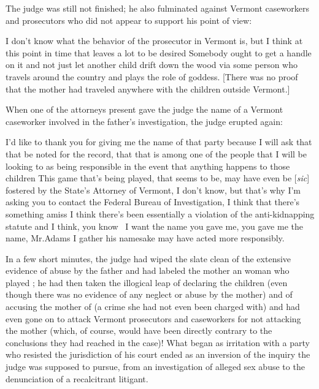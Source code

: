 \documentclass[11pt, twoside]{article}
\begin{document}
{{\nip{}%
The judge was still not finished; he also fulminated against Vermont
caseworkers and prosecutors who did not appear to support his point
of view:

\begin{blockQuote}
I don’t know what the behavior of the prosecutor in Vermont is, but
I think at this point in time that leaves a lot to be desired\ellFour{2pt}{2pt} Somebody ought to get a handle on it and not just let another child drift
down the wood via some person who travels around the country
and plays the role of goddess. [There was no proof that the mother
had traveled anywhere with the children outside Vermont.]
\end{blockQuote}

\nip{}%
When one of the attorneys present gave the judge the name of a Vermont
caseworker involved in the father’s investigation, the judge erupted
again:

\begin{blockQuote}
I’d like to thank you for giving me the name of that party because
I will ask that that be noted for the record, that that is among one
of the people that I will be looking to as being responsible in the
event that anything happens to those children\ellFour{2pt}{2pt} This game that’s
being played, that seems to be, may have even be [\textit{sic}] fostered by
the State’s Attorney of Vermont, I don’t know, but that’s why I’m
asking you to contact the Federal Bureau of Investigation, I think
that there’s something amiss\ellFour{2pt}{2pt} I think there’s been essentially a
violation of the anti-kidnapping statute and I think, you know \ellThree{2pt}{2pt}\ I
want the name you gave me, you gave me the name, Mr.\@ Adams\ellFour{2pt}{2pt}
I gather his namesake may have acted more responsibly.
\end{blockQuote}

\nip{}%
In a few short minutes, the judge had wiped the slate clean of the extensive evidence of abuse by the father and had labeled the mother an
 woman who played ; he had then taken
the illogical leap of declaring the children  (even though there was no
evidence of any neglect or abuse by the mother) and of accusing the mother
of  (a crime she had not even been charged with) and had
even gone on to attack Vermont prosecutors and caseworkers for not attacking the
mother (which, of course, would have been directly contrary to the conclusions they had reached in the case)! What began as irritation with a
party who resisted the jurisdiction of his court ended as an inversion of
the inquiry the judge was supposed to pursue, from an investigation of
alleged sex abuse to the denunciation of a recalcitrant litigant.
}%

}
\end{document}
